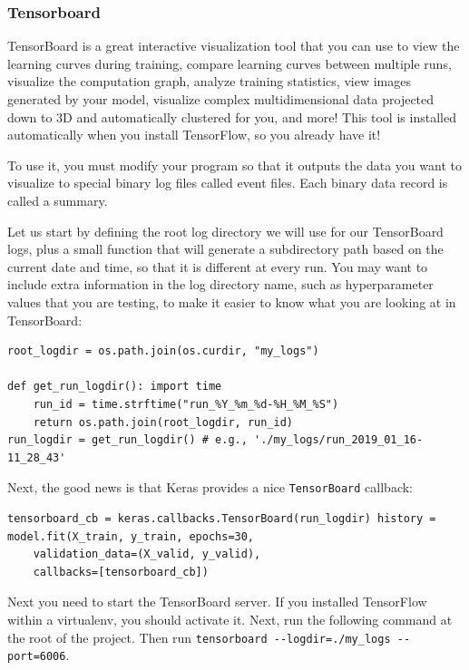 \documentclass[12pt, letterpaper]{article}
\theoremstyle{definition}
\begin{document}
\subsubsection{Tensorboard}
TensorBoard is a great interactive visualization tool that you can use to view the learning curves during training, compare learning curves between multiple runs, visualize the computation graph, analyze training statistics, view images generated by your model, visualize complex multidimensional data projected down to 3D and automatically clustered for you, and more! This tool is installed automatically when you install TensorFlow, so you already have it!

To use it, you must modify your program so that it outputs the data you want to visualize to special binary log files called event files. Each binary data record is called a summary.

Let us start by defining the root log directory we will use for our TensorBoard logs, plus a small function that will generate a subdirectory path based on the current date and time, so that it is different at every run. You may want to include extra information in the log directory name, such as hyperparameter values that you are testing, to make it easier to know what you are looking at in TensorBoard:

\begin{lstlisting}
root_logdir = os.path.join(os.curdir, "my_logs")

def get_run_logdir(): import time
    run_id = time.strftime("run_%Y_%m_%d-%H_%M_%S")
    return os.path.join(root_logdir, run_id)
run_logdir = get_run_logdir() # e.g., './my_logs/run_2019_01_16-11_28_43'
\end{lstlisting}

Next, the good news is that Keras provides a nice \lstinline+TensorBoard+ callback:

\begin{lstlisting}
tensorboard_cb = keras.callbacks.TensorBoard(run_logdir) history = model.fit(X_train, y_train, epochs=30,
	validation_data=(X_valid, y_valid),
    callbacks=[tensorboard_cb])
\end{lstlisting}

Next you need to start the TensorBoard server. If you installed TensorFlow within a virtualenv, you should activate it. Next, run the following command at the root of the project. Then run \lstinline+tensorboard --logdir=./my_logs --port=6006+.
\end{document}
